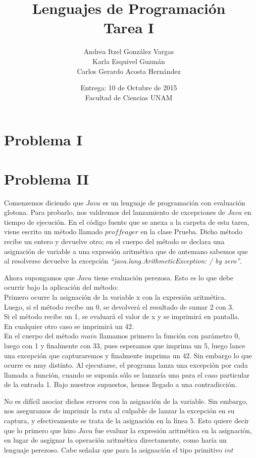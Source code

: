\documentclass[12pt]{article}
\title{Lenguajes de Programación \\ Tarea I}
\author{Andrea Itzel González Vargas \\ Karla Esquivel Guzmán \\ Carlos Gerardo Acosta Hernández}
\date{Entrega: 10 de Octubre de 2015 \\ Facultad de Ciencias UNAM}
\begin{document}
\maketitle
\section*{Problema I}
\section*{Problema II}
Comenzemos diciendo que $Java$ es un lenguaje de programación con evaluación glotona. Para probarlo, nos valdremos del lanzamiento de excepciones de
$Java$ en tiempo de ejecución. En el código fuente que se anexa a la carpeta de esta tarea, viene escrito un método llamado $proffeager$ en la clase
Prueba. Dicho método recibe un entero y devuelve otro; en el cuerpo del método se declara una asignación de variable a una expresión aritmética que
de antemano sabemos que al resolverse devuelve la excepción \textit{``java.lang.ArithmeticException: / by zero''}. \par
Ahora supongamos que $Java$ tiene evaluación perezosa. Esto es lo que debe ocurrir bajo la aplicación del método:\\
Primero ocurre la asignación de la variable x con la expresión aritmética.\\ Luego,
si el método recibe un 0, se devolverá el resultado de sumar 2 con 3. \\
Si el método recibe un 1, se evaluará el valor de x y se imprimirá en pantalla. \\
En cualquier otro caso se imprimirá un 42. \\
En el cuerpo del método $main$ llamamos primero la función con parámetro 0, luego con 1 y finalmente con 33, pues esperamos que imprima un 5, luego lance una excepción que capturaremos y finalmente imprima un 42.
Sin embargo lo que ocurre es muy distinto. Al ejecutarse, el programa lanza una excepción por cada llamada a función, cuando
se suponía sólo se lanzaría una para el caso particular de la entrada 1. Bajo nuestros supuestos, hemos llegado a una contradicción. \par
No es difícil asociar dichos errores
con la asignación de la variable. Sin embargo, nos aseguramos de imprimir la ruta al culpable de lanzar la excepción en su captura, y efectivamente
se trata de la asignación en la línea 5. Esto quiere decir que lo primero que hizo $Java$ fue evaluar la expresión aritmética en la asignación,
en lugar de asgignar la operación aritmética directamente, como haría un lenguaje perezoso. Cabe señalar que para la asignación el tipo primitivo $int$
\end{document}
